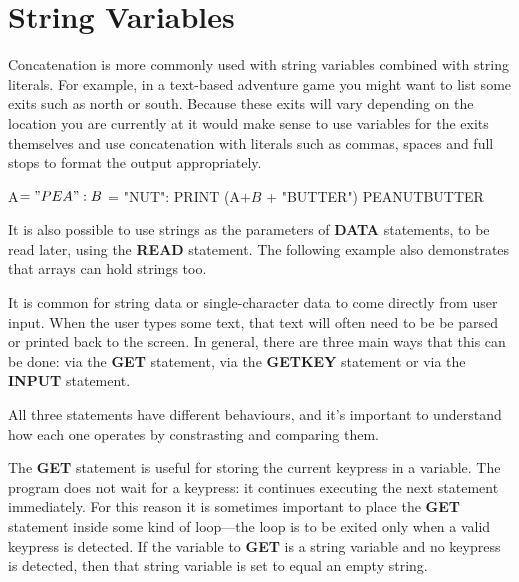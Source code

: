 \section{String Variables}

Concatenation is more commonly used with string variables combined with string literals. For example, in a text-based adventure game you might want to list some exits such as north or south. Because these exits will vary depending on the location you are currently at it would make sense to use variables for the exits themselves and use concatenation with literals such as commas, spaces and full stops to format the output appropriately.

\begin{screenoutput}
A$ = "PEA": B$ = "NUT": PRINT (A$ + B$ + "BUTTER")
PEANUTBUTTER
\end{screenoutput}

It is also possible to use strings as the parameters of {\bf DATA} statements, to be read later, using the {\bf READ} statement. The following example also demonstrates that arrays can hold strings too.


It is common for string data or single-character data to come directly from user input. When the user types some text, that text will often need to be be parsed or printed back to the screen. In general, there are three main ways that this can be done: via the {\bf GET} statement, via the {\bf GETKEY} statement or via the {\bf INPUT} statement.

All three statements have different behaviours, and it's important to understand how each one operates by constrasting and comparing them.

The {\bf GET} statement is useful for storing the current keypress in a variable. The program does not wait for a keypress: it continues executing the next statement immediately. For this reason it is sometimes important to place the {\bf GET} statement inside some kind of loop---the loop is to be exited only when a valid keypress is detected. If the variable to {\bf GET} is a string variable and no keypress is detected, then that string variable is set to equal an empty string.

